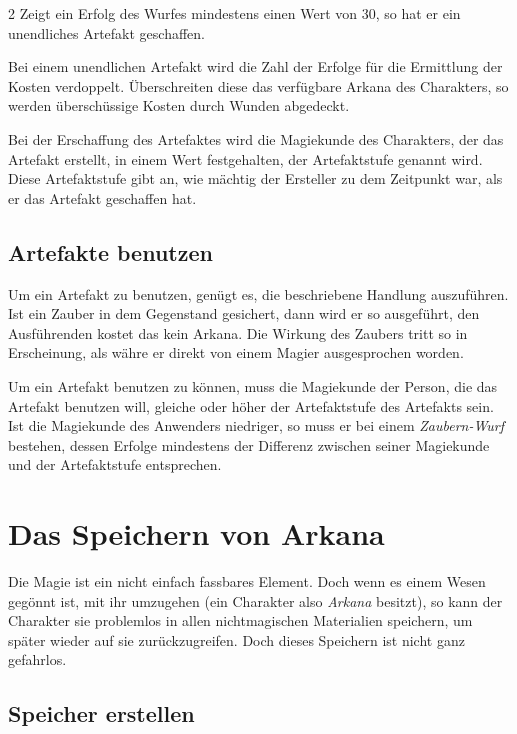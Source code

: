 \begin{multicols}{2}
Zeigt ein Erfolg des Wurfes mindestens einen Wert von 30, so hat er ein unendliches Artefakt geschaffen.

Bei einem unendlichen Artefakt wird die Zahl der Erfolge für die Ermittlung der Kosten verdoppelt. Überschreiten diese das verfügbare Arkana des Charakters, so werden überschüssige Kosten durch Wunden abgedeckt.

Bei der Erschaffung des Artefaktes wird die Magiekunde des Charakters, der das Artefakt erstellt, in einem Wert festgehalten, der Artefaktstufe genannt wird. Diese Artefaktstufe gibt an, wie mächtig der Ersteller zu dem Zeitpunkt war, als er das Artefakt geschaffen hat.

\subsection{Artefakte benutzen}

Um ein Artefakt zu benutzen, genügt es, die beschriebene Handlung auszuführen. Ist ein Zauber in dem Gegenstand gesichert, dann wird er so ausgeführt, den Ausführenden kostet das kein Arkana. Die Wirkung des Zaubers tritt so in Erscheinung, als währe er direkt von einem Magier ausgesprochen worden.

Um ein Artefakt benutzen zu können, muss die Magiekunde der Person, die das Artefakt benutzen will, gleiche oder höher der Artefaktstufe des Artefakts sein. Ist die Magiekunde des Anwenders niedriger, so muss er bei einem \textit{Zaubern-Wurf} bestehen, dessen Erfolge mindestens der Differenz zwischen seiner Magiekunde und der Artefaktstufe entsprechen.

\section{Das Speichern von Arkana}

Die Magie ist ein nicht einfach fassbares Element. Doch wenn es einem Wesen gegönnt ist, mit ihr umzugehen (ein Charakter also \textit{Arkana} besitzt), so kann der Charakter sie problemlos in allen nichtmagischen Materialien speichern, um später wieder auf sie zurückzugreifen. Doch dieses Speichern ist nicht ganz gefahrlos.

\subsection{Speicher erstellen}


\end{multicols}
